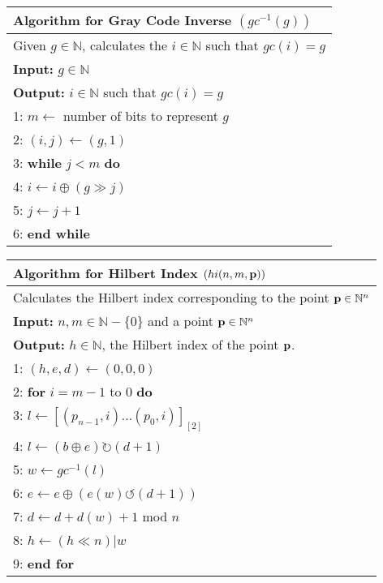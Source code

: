 \documentclass[10pt]{article}
\begin{document}
\begin{table}

  \begin{tabular}{l}
    \hline
    Algorithm for Gray Code Inverse $\left( gc^{-1}\left( g \right) \right)$\\
    \hline
    Given $g \in \mathbb{N}$, calculates the $i \in \mathbb{N}$ such that $gc\left( i \right) = g $ \\
    {\bf Input:} $g \in \mathbb{N}$\\
    {\bf Output:} $i \in \mathbb{N}$ such that $gc \left( i \right) = g $\\
    1: $ m \leftarrow $ number of bits to represent $g$ \\
    2: $ \left( i, j \right) \leftarrow \left( g, 1 \right) $ \\
    3: {\bf while} $ j < m $ {\bf do} \\
    4: {     } $ i \leftarrow i \oplus \left( g \gg j \right)$ \\
    5: {     } $ j \leftarrow j + 1$ \\
    6: {\bf end while} \\
    \hline
  \end{tabular}
  \label{gray-code-inverse}
\end{table}

\begin{table}
  
  \begin{tabular}{l}
    \hline
    Algorithm for Hilbert Index $(hi(n, m, {\bf p}))$ \\
    \hline
    Calculates the Hilbert index corresponding to the point ${\bf p} \in \mathbb{N}^n $ \\
    {\bf Input:} $n, m \in \mathbb{N} - \{0\} $ and a point ${\bf p} \in \mathbb{N}^n$ \\
    {\bf Output:} $h \in \mathbb{N}$, the Hilbert index of the point ${\bf p}$. \\
    1: $ \left( h, e, d \right) \leftarrow \left( 0, 0, 0 \right) $ \\
    2: {\bf for} $ i = m - 1 $ to $ 0 $ { \bf do} \\
    3: {     } $ l \leftarrow \left[ \left( p_{n-1} , i \right) \ldots \left( p_0 , i \right) \right]_{\left[ 2 \right]} $ \\
    4: {     } $ l \leftarrow \left( b \oplus e \right) \rightturn \left( d+1 \right)$ \\
    5: {     } $ w \leftarrow gc^{-1} \left( l \right)$ \\
    6: {     } $ e \leftarrow e \oplus \left( e \left( w \right) \leftturn \left( d+ 1 \right) \right) $ \\
    7: {     } $ d \leftarrow d + d \left( w \right) + 1 $ mod $n$ \\
    8: {     } $ h \leftarrow \left( h \ll n \right) | w $ \\
    9: {\bf end for} \\
    \hline
  \end{tabular}
  \label{hilbert-point-to-index}
\end{table}
\end{document}

